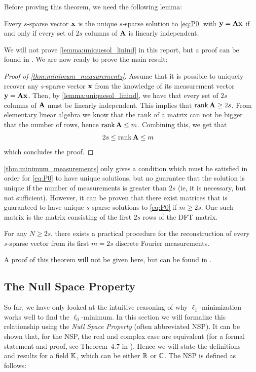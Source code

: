 Before proving this theorem, we need the following lemma:
\begin{lemma}
	\label{lemma:uniquesol_linind}
	Every $ s $-sparse vector $ \mathbf{x} $ is the unique $ s $-sparse solution to \eqref{eq:P0} with $ \mathbf{y} = \mathbf{A}\mathbf{x} $ if and only if every set of $ 2s $ columns of $ \mathbf{A} $ is linearly independent.
\end{lemma}

We will not prove \cref{lemma:uniquesol_linind} in this report, but a proof can be found in \cite[Theorem~2.13]{foucart13intro}. We are now ready to prove the main result:
\begin{proof}[Proof of \cref{thm:minimum_measurements}]
	Assume that it is possible to uniquely recover any $ s $-sparse vector $ \mathbf{x} $ from the knowledge of its measurement vector $ \mathbf{y} = \mathbf{A}\mathbf{x} $. Then, by \cref{lemma:uniquesol_linind}, we have that every set of $ 2s $ columns of $ \mathbf{A} $ must be linearly independent. This implies that $ \operatorname{rank} \mathbf{A} \geq 2s $. From elementary linear algebra we know that the rank of a matrix can not be bigger that the number of rows, hence $ \operatorname{rank} \mathbf{A} \leq m $. Combining this, we get that
	\[
		2s \leq \operatorname{rank} \mathbf{A} \leq m
	\]
	which concludes the proof.
\end{proof}

\cref{thm:minimum_measurements} only gives a condition which must be satisfied in order for \eqref{eq:P0} to have unique solutions, but no guarantee that the solution is unique if the number of measurements is greater than $ 2s $ (ie, it is necessary, but not sufficient). However, it can be proven that there exist matrices that is guaranteed to have unique $ s $-sparse solutions to \eqref{eq:P0} if $ m \geq 2s $. One such matrix is the matrix consisting of the first $ 2s $ rows of the DFT matrix.

\begin{theorem}
	\label{thm:uniquesol_dft}
	For any $ N \geq 2s $, there exists a practical procedure for the reconstruction of every $ s $-sparse vector from its first $ m = 2s $ discrete Fourier measurements.
\end{theorem}

A proof of this theorem will not be given here, but can be found in \cite[Theorem~2.15]{foucart13intro}.




\subsection{The Null Space Property}
\label{sec:NSP}
So far, we have only looked at the intuitive reasoning of why $ \ell_{1} $-minimization works well to find the $ \ell_{0} $-minimum. In this section we will formalize this relationship using the \textit{Null Space Property} (often abbreviated NSP). It can be shown that, for the NSP, the real and complex case are equivalent (for a formal statement and proof, see Theorem~4.7 in \cite{foucart13intro}). Hence we will state the definitions and results for a field $ \mathbb{K} $, which can be either $ \mathbb{R} $ or $ \mathbb{C} $. The NSP is defined as follows:

